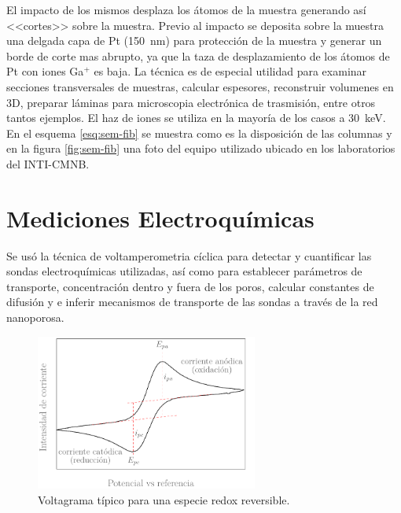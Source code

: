 		El impacto de los mismos desplaza los átomos de la muestra generando así <<cortes>> sobre la muestra. Previo al impacto se deposita sobre la muestra una delgada capa de Pt (\SI{150}{\nm}) para protección de la muestra y generar un borde de corte mas abrupto, ya que la taza de desplazamiento de los átomos de Pt con iones Ga${^+}$ es baja.\cite{Giannuzzi2005} La técnica es de especial utilidad para examinar secciones transversales de muestras, calcular espesores, reconstruir volumenes en 3D, preparar láminas para microscopia electrónica de trasmisión, entre otros tantos ejemplos. El haz de iones se utiliza en la mayoría de los casos a \SI{30}{\kilo\electronvolt}. En el esquema \ref{esq:sem-fib} se muestra como es la disposición de las columnas y en la figura \ref{fig:sem-fib} una foto del equipo utilizado ubicado en los laboratorios del INTI-CMNB.

\section{Mediciones Electroquímicas}\label{sec:medidas_eq}
	
	\marginpar
	 Se usó la técnica de voltamperometria cíclica para detectar y cuantificar las sondas electroquímicas utilizadas, así como para establecer parámetros de transporte, concentración dentro y fuera de los poros, calcular constantes de difusión y e inferir mecanismos de transporte de las sondas a través de la red nanoporosa.\cite{Wi2000,Skoog1995,Gewirth2004} 


			\begin{figure}[ht]
			 		  \begin{center}
			 		  \includegraphics[width=0.65\textwidth]{Esquemas/CV_ideal.pdf}
			 		  \caption[Voltamperograma ideal]{Voltagrama típico para una especie redox reversible.}
			 		  \label{fig:CV_ideal}
			 		  \end{center}
			 		  \end{figure}

